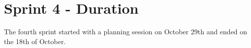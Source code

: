 \section{Sprint 4 - Duration}
The fourth sprint started with a planning session on October 29th and ended on the 18th of October.  
\newline



